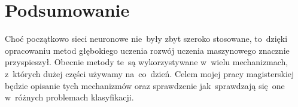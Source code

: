 \chapter{Podsumowanie}
Choć początkowo sieci neuronowe nie~były zbyt szeroko stosowane, to~dzięki
opracowaniu metod głębokiego uczenia rozwój uczenia maszynowego znacznie przyspieszył. Obecnie metody
te~są wykorzystywane w~wielu mechanizmach, z~których dużej części używamy na~co~dzień. Celem mojej pracy
magisterskiej będzie opisanie tych mechanizmów oraz sprawdzenie jak~sprawdzają się~one w~różnych problemach
klasyfikacji.
